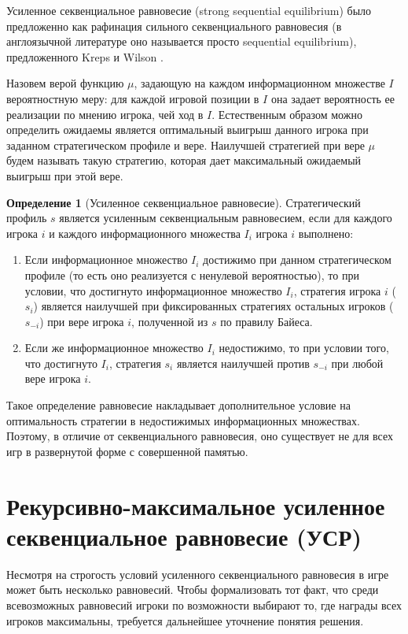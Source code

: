 \documentclass{mipt-thesis-bs}
\theoremstyle{plain}
\theoremstyle{definition}
\newtheorem{definition}{Определение}
\begin{document}
Усиленное секвенциальное равновесие (strong sequential equilibrium) было предложенно как рафинация сильного секвенциального равновесия (в англоязычной литературе оно называется просто sequential equilibrium), предложенного Kreps и Wilson \cite{kreps1982sequential}.

Назовем верой функцию $\mu$, задающую на каждом информационном множестве $I$ вероятностную меру: для каждой игровой позиции в $I$ она задает вероятность ее реализации по мнению игрока, чей ход в $I$. Естественным образом можно определить ожидаемы является оптимальный выигрыш данного игрока при заданном стратегическом профиле и вере. Наилучшей стратегией при вере $\mu$ будем называть такую стратегию, которая дает максимальный ожидаемый выигрыш при этой вере.
\begin{definition}[Усиленное секвенциальное равновесие]
Стратегический профиль $s$ является усиленным секвенциальным равновесием, если для каждого игрока $i$ и каждого информационного множества $I_i$ игрока $i$ выполнено:

\begin{enumerate}
    \item Если информационное множество $I_i$ достижимо при данном стратегическом профиле (то есть оно реализуется с ненулевой вероятностью), то при условии, что достигнуто информационное множество $I_i$, стратегия игрока $i$ ($s_i$) является наилучшей при фиксированных стратегиях остальных игроков ($s_{-i}$) при вере игрока $i$, полученной из $s$ по правилу Байеса.
    \item Если же информационное множество $I_i$ недостижимо, то при условии того, что достигнуто $I_i$, стратегия $s_i$ является наилучшей против $s_{-i}$ при любой вере игрока $i$.
\end{enumerate}
\end{definition}

Такое определение равновесие накладывает дополнительное условие на оптимальность стратегии в недостижимых информационных множествах. Поэтому, в отличие от секвенциального равновесия, оно существует не для всех игр в развернутой форме с совершенной памятью.

\section{Рекурсивно-максимальное усиленное секвенциальное равновесие (УСР)}

Несмотря на строгость условий усиленного секвенциального равновесия в игре может быть несколько равновесий. Чтобы формализовать тот факт, что среди всевозможных равновесий игроки по возможности выбирают то, где награды всех игроков максимальны, требуется дальнейшее уточнение понятия решения.
\end{document}
